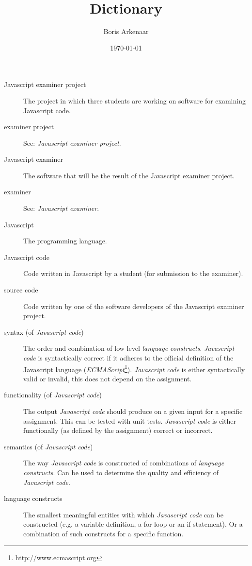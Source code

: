 \documentclass{article}
\begin{document}
\title{Dictionary}
\author{Boris Arkenaar}
\date{\today}
\maketitle

\begin{description}
  \item[Javascript examiner project] The project in which three students are
    working on software for examining Javascript code.
  \item[examiner project] See: {\em Javascript examiner project}.
  \item[Javascript examiner] The software that will be the result of the
    Javascript examiner project.
  \item[examiner] See: {\em Javascript examiner}.
  \item[Javascript] The programming language.
  \item[Javascript code] Code written in Javascript by a student (for
    submission to the examiner).
  \item[source code] Code written by one of the software developers of the
    Javascript examiner project.
  \item[syntax (of {\em Javascript code})] The order and combination of low
    level {\em language constructs}. {\em Javascript code} is syntactically
    correct if it adheres to the official definition of the Javascript language
    ({\em ECMAScript}\footnote{http://www.ecmascript.org}). {\em Javascript
    code} is either syntactically valid or invalid, this does not depend on the
    assignment.
  \item[functionality (of {\em Javascript code})] The output {\em Javascript
    code} should produce on a given input for a specific assignment. This can
    be tested with unit tests. {\em Javascript code} is either functionally (as
    defined by the assignment) correct or incorrect.
  \item[semantics (of {\em Javascript code})] The way {\em Javascript code} is
    constructed of combinations of {\em language constructs}. Can be used to
    determine the quality and efficiency of {\em Javascript code}.
  \item[language constructs] The smallest meaningful entities with which {\em
    Javascript code} can be constructed (e.g. a variable definition, a for loop
    or an if statement). Or a combination of such constructs for a specific
    function.
\end{description}
\end{document}
